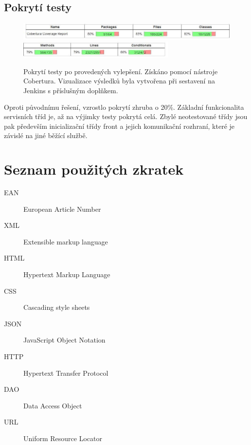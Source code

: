 \documentclass[thesis=B,czech]{FITthesis}[2012/06/26]
\begin{document}
\section{Pokrytí testy}
\begin{figure}[h]\centering
 	\includegraphics[width=1.0\textwidth]{resources/cobertura-report-new-1}
 	\includegraphics[width=0.7\textwidth]{resources/cobertura-report-new-2}
	\caption[Pokrytí testy po provedených vylepšení]{Pokrytí testy po provedených vylepšení. Získáno pomocí nástroje Cobertura. Vizualizace
	výsledků byla vytvořena při sestavení na Jenkins s příslušným doplňkem.}\label{fig:cober-new}
\end{figure}

Oproti původnímu řešení, vzrostlo pokrytí zhruba o 20\%. Základní funkcionalita servisních tříd je, až na výjimky testy pokrytá celá.
Zbylé neotestované třídy jsou pak především inicializační třídy front a jejich komunikační rozhraní, které je závislé na jiné běžící službě.








\appendix
\chapter{Seznam použitých zkratek}
\begin{description}
	\item[EAN] European Article Number
	\item[XML] Extensible markup language
	\item[HTML] Hypertext Markup Language
	\item[CSS] Cascading style sheets
	\item[JSON] JavaScript Object Notation
	\item[HTTP] Hypertext Transfer Protocol
	\item[DAO] Data Access Object
	\item[URL] Uniform Resource Locator

\end{description}
\end{document}
